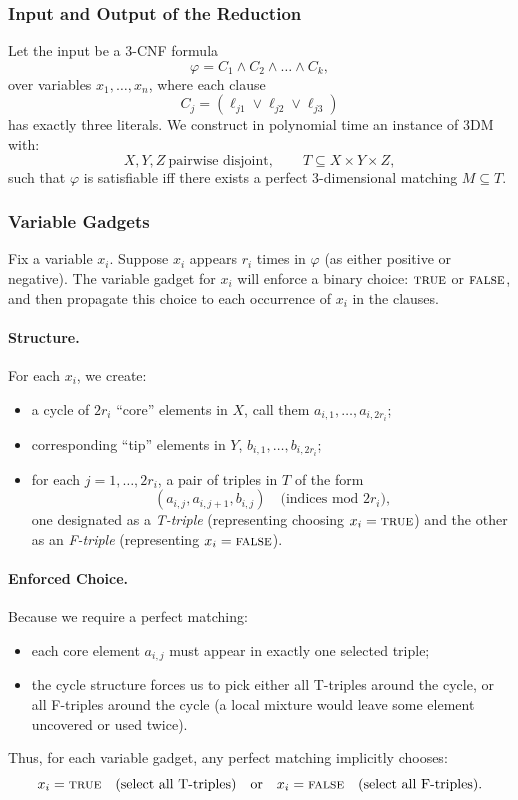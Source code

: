 \documentclass[9pt]{extarticle}
\begin{document}
\subsubsection*{Input and Output of the Reduction}

Let the input be a 3-CNF formula
\[
    \varphi = C_1 \land C_2 \land \dots \land C_k,
\]
over variables \(x_1,\dots,x_n\), where each clause
\[
    C_j = (\ell_{j1} \lor \ell_{j2} \lor \ell_{j3})
\]
has exactly three literals.  We construct in polynomial time an instance of
\textsc{3DM} with:
\[
    X, Y, Z \ \text{pairwise disjoint}, \qquad
    T \subseteq X \times Y \times Z,
\]
such that \(\varphi\) is satisfiable iff there exists a perfect 3-dimensional
matching \(M \subseteq T\).

\subsubsection*{Variable Gadgets}

Fix a variable \(x_i\).  Suppose \(x_i\) appears \(r_i\) times in \(\varphi\)
(as either positive or negative).  The variable gadget for \(x_i\) will enforce
a binary choice: \(\textsc{true}\) or \(\textsc{false}\), and then propagate
this choice to each occurrence of \(x_i\) in the clauses.

\paragraph{Structure.}
For each \(x_i\), we create:
\begin{itemize}
    \item a cycle of \(2r_i\) ``core'' elements in \(X\), call them
          \(a_{i,1},\dots,a_{i,2r_i}\);
    \item corresponding ``tip'' elements in \(Y\),
          \(b_{i,1},\dots,b_{i,2r_i}\);
    \item for each \(j=1,\dots,2r_i\), a pair of triples in \(T\) of the form
          \[
            (a_{i,j}, a_{i,j+1}, b_{i,j}) \quad \text{(indices mod } 2r_i\text{),}
          \]
          one designated as a \emph{T-triple} (representing choosing \(x_i=\textsc{true}\))
          and the other as an \emph{F-triple} (representing \(x_i=\textsc{false}\)).
\end{itemize}

\paragraph{Enforced Choice.}
Because we require a perfect matching:
\begin{itemize}
    \item each core element \(a_{i,j}\) must appear in exactly one selected triple;
    \item the cycle structure forces us to pick either all T-triples around the
          cycle, or all F-triples around the cycle (a local mixture would leave
          some element uncovered or used twice).
\end{itemize}
Thus, for each variable gadget, any perfect matching implicitly chooses:
\[
x_i = \textsc{true} \quad\text{(select all T-triples)} 
\quad\text{or}\quad
x_i = \textsc{false} \quad\text{(select all F-triples)}.
\]
\end{document}
